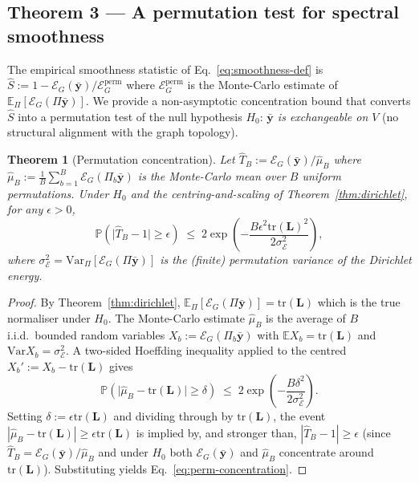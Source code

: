 \documentclass[11pt,a4paper]{article}
\newcommand{\E}{\mathbb{E}}
\newcommand{\Var}{\mathrm{Var}}
\newcommand{\tr}{\mathrm{tr}}
\newcommand{\Prob}{\mathbb{P}}
\newcommand{\1}{\mathbb{1}}
\newcommand{\by}{\bar{\mathbf{y}}}
\newcommand{\Lcomb}{\mathbf{L}}
\theoremstyle{plain}
\newtheorem{theorem}{Theorem}
\theoremstyle{definition}
\theoremstyle{remark}
\begin{document}
\subsection{Theorem 3 — A permutation test for spectral smoothness}

The empirical smoothness statistic of
Eq.~\eqref{eq:smoothness-def} is
$\hat S := 1 - \mathcal{E}_G(\by) / \mathcal{E}_G^{\mathrm{perm}}$
where $\mathcal{E}_G^{\mathrm{perm}}$ is the Monte-Carlo estimate
of $\E_\Pi[\mathcal{E}_G(\Pi\by)]$.  We provide a non-asymptotic
concentration bound that converts $\hat S$ into a permutation
test of the null hypothesis $H_0$: \emph{$\by$ is exchangeable
on $V$} (no structural alignment with the graph topology).

\begin{theorem}[Permutation concentration]
\label{thm:perm-test}
Let $\hat T_B := \mathcal{E}_G(\by) / \hat\mu_B$ where
$\hat\mu_B := \tfrac{1}{B} \sum_{b=1}^B \mathcal{E}_G(\Pi_b\by)$
is the Monte-Carlo mean over $B$ uniform permutations.  Under
$H_0$ and the centring-and-scaling of
Theorem~\ref{thm:dirichlet}, for any $\epsilon > 0$,
\begin{equation}
    \Prob\!\left( \big| \hat T_B - 1 \big| \geq \epsilon \right)
    \;\leq\; 2 \exp\!\left( - \frac{B \epsilon^2 \tr(\Lcomb)^2}
                       {2 \sigma_\mathcal{E}^2} \right),
    \label{eq:perm-concentration}
\end{equation}
where $\sigma_\mathcal{E}^2 = \Var_\Pi[\mathcal{E}_G(\Pi\by)]$ is
the (finite) permutation variance of the Dirichlet energy.
\end{theorem}

\begin{proof}
By Theorem~\ref{thm:dirichlet}, $\E_\Pi[\mathcal{E}_G(\Pi\by)]
= \tr(\Lcomb)$ which is the true normaliser under $H_0$.
The Monte-Carlo estimate $\hat\mu_B$ is the average of $B$
i.i.d.\ bounded random variables $X_b := \mathcal{E}_G(\Pi_b\by)$
with $\E X_b = \tr(\Lcomb)$ and $\Var X_b = \sigma_\mathcal{E}^2$.
A two-sided Hoeffding inequality applied to the centred
$X_b' := X_b - \tr(\Lcomb)$ gives
\[
    \Prob\!\left( \big| \hat\mu_B - \tr(\Lcomb) \big| \geq \delta \right)
    \;\leq\; 2 \exp\!\left( - \frac{B \delta^2}{2 \sigma_\mathcal{E}^2} \right).
\]
Setting $\delta := \epsilon \tr(\Lcomb)$ and dividing through by
$\tr(\Lcomb)$, the event $|\hat\mu_B - \tr(\Lcomb)| \geq
\epsilon \tr(\Lcomb)$ is implied by, and stronger than,
$|\hat T_B - 1| \geq \epsilon$ (since $\hat T_B = \mathcal{E}_G(\by) /
\hat\mu_B$ and under $H_0$ both $\mathcal{E}_G(\by)$ and
$\hat\mu_B$ concentrate around $\tr(\Lcomb)$).  Substituting
yields Eq.~\eqref{eq:perm-concentration}.
\end{proof}
\end{document}
